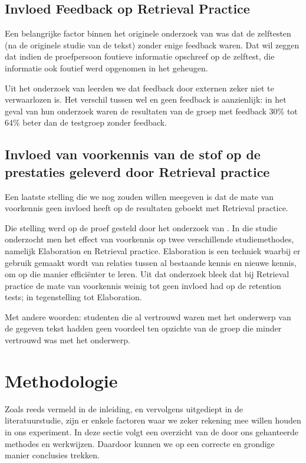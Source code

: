 \documentclass{hogent-article}
\begin{document}
\subsection{Invloed Feedback op Retrieval Practice}

Een belangrijke factor binnen het originele onderzoek van \textcite{Roediger_2006} was dat de zelftesten (na de originele studie van de tekst) zonder enige feedback waren. Dat wil zeggen dat indien de proefpersoon foutieve informatie opschreef op de zelftest, die informatie ook foutief werd opgenomen in het geheugen.\\
\par
\noindent
Uit het onderzoek van \textcite{Roediger_2011} leerden we dat feedback door externen zeker niet te verwaarlozen is. Het verschil tussen wel en geen feedback is aanzienlijk: in het geval van hun onderzoek waren de resultaten van de groep met feedback 30\% tot 64\% beter dan de testgroep zonder feedback.

\subsection{Invloed van voorkennis van de stof op de prestaties geleverd door Retrieval practice}
\label{voorkennis}
Een laatste stelling die we nog zouden willen meegeven is dat de mate van voorkennis geen invloed heeft op de resultaten geboekt met Retrieval practice.\\
\par
\noindent
Die stelling werd op de proef gesteld door het onderzoek van \textcite{Xiaofeng_2016}. In die studie onderzocht men het effect van voorkennis op twee verschillende studiemethodes, namelijk Elaboration en Retrieval practice. Elaboration is een techniek waarbij er gebruik gemaakt wordt van relaties tussen al bestaande kennis en nieuwe kennis, om op die manier efficiënter te leren. Uit dat onderzoek bleek dat bij Retrieval practice de mate van voorkennis weinig tot geen invloed had op de retention tests; in tegenstelling tot Elaboration.\\
\par
\noindent
Met andere woorden: studenten die al vertrouwd waren met het onderwerp van de gegeven tekst hadden geen voordeel ten opzichte van de groep die minder vertrouwd was met het onderwerp.

\section{Methodologie}
\label{methodologie}
Zoals reeds vermeld in de inleiding, en vervolgens uitgediept in de literatuurstudie, zijn er enkele factoren waar we zeker rekening mee willen houden in ons experiment. In deze sectie volgt een overzicht van de door ons gehanteerde methodes en werkwijzen. Daardoor kunnen we op een correcte en grondige manier conclusies trekken.
\end{document}
